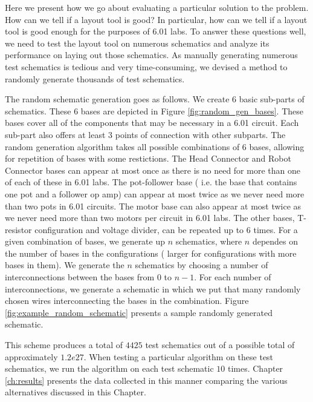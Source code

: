 Here we present how we go about evaluating a particular solution to the problem.
How can we tell if a layout tool is good? In particular, how can we tell if a
layout tool is good enough for the purposes of 6.01 labs. To answer these
questions well, we need to test the layout tool on numerous schematics and
analyze its performance on laying out those schematics. As manually generating
numerous test schematics is tedious and very time-consuming, we devised a method
to randomly generate thousands of test schematics.

The random schematic generation goes as follows. We create $6$ basic sub-parts
of schematics. These $6$ bases are depicted in Figure
\ref{fig:random_gen_bases}. These bases cover all of the components that may be
necessary in a 6.01 circuit. Each sub-part also offers at least $3$ points of
connection with other subparts. The random generation algorithm takes all
possible combinations of
$6$ bases, allowing for repetition of bases with some restictions.
The Head Connector and Robot Connector bases can appear at most once as there is
no need for more than one of each of these in 6.01 labs. The pot-follower base (
i.e. the base that contains one pot and a follower op amp) can appear at most
twice as we never need more than two pots in 6.01 circuits. The motor base can
also appear at most twice as we never need more than two motors per circuit in
6.01 labs. The other bases, T-resistor configuration and voltage divider, can be
repeated up to 6 times. For a given combination of bases, we generate up $n$
schematics, where $n$ dependes on the number of bases in the configurations (
larger for configurations with more bases in them).
We generate the $n$ schematics by choosing a number of interconnections between
the bases from $0$ to $n-1$. For each number of interconnections, we generate
a schematic in which we put that many randomly chosen wires interconnecting
the bases in the combination. Figure \ref{fig:example_random_schematic} presents
a sample randomly generated schematic.

This scheme produces a total of $4425$ test schematics out of a possible total
of approximately $1.2e27$. When testing a particular algorithm on these test
schematics, we run the algorithm on each test schematic $10$ times. Chapter
\ref{ch:results} presents the data collected in this manner comparing the
various alternatives discussed in this Chapter.


